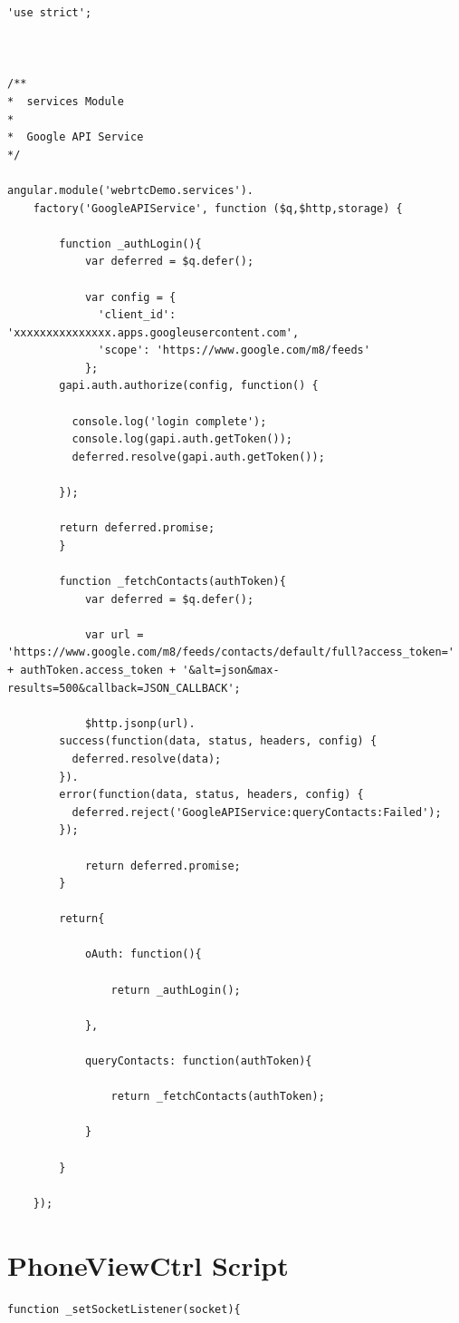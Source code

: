 \begin{appendices}
\begin{lstlisting}[caption={GoogleAPIService.js in application client},label={code:google_api}]
'use strict';



/**
*  services Module
*
*  Google API Service
*/

angular.module('webrtcDemo.services').
	factory('GoogleAPIService', function ($q,$http,storage) {

		function _authLogin(){
			var deferred = $q.defer();

			var config = {
		      'client_id': 'xxxxxxxxxxxxxxx.apps.googleusercontent.com',
		      'scope': 'https://www.google.com/m8/feeds'
		    };
	    gapi.auth.authorize(config, function() {

	      console.log('login complete');
	      console.log(gapi.auth.getToken());
	      deferred.resolve(gapi.auth.getToken());

	    });

	    return deferred.promise;
		}

		function _fetchContacts(authToken){
			var deferred = $q.defer();

			var url = 'https://www.google.com/m8/feeds/contacts/default/full?access_token=' + authToken.access_token + '&alt=json&max-results=500&callback=JSON_CALLBACK';

			$http.jsonp(url).
	    success(function(data, status, headers, config) {
	      deferred.resolve(data);
	    }).
	    error(function(data, status, headers, config) {
	      deferred.reject('GoogleAPIService:queryContacts:Failed');
	    });

			return deferred.promise;
		}

		return{
			
			oAuth: function(){

				return _authLogin();
			
			},

			queryContacts: function(authToken){

				return _fetchContacts(authToken);

			}

		}

	});
\end{lstlisting}

\section{PhoneViewCtrl Script}

\begin{lstlisting}[caption={\_setSocketListener() Function in PhoneViewCtrl.js on Application Client},label={code:client_socket}]
function _setSocketListener(socket){


\end{lstlisting}
\end{appendices}
